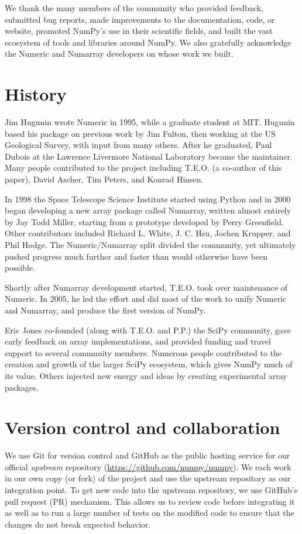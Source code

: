 We thank the many members of the community who provided
feedback, submitted bug reports, made improvements to the documentation,
code, or website, promoted NumPy's use in their scientific fields, and built
the vast ecosystem of tools and libraries around NumPy.
We also gratefully acknowledge the Numeric and Numarray developers
on whose work we built.

\section*{History}

Jim Hugunin wrote Numeric in 1995, while a graduate student at MIT.
Hugunin based his package on previous work by Jim Fulton, then working at the
US Geological Survey, with input from many others.
After he graduated, Paul Dubois at the Lawrence Livermore National Laboratory
became the maintainer.
Many people contributed to the project including T.E.O. (a co-author
of this paper), David Ascher, Tim Peters, and Konrad Hinsen.

In 1998 the Space Telescope Science Institute started using Python
and in 2000 began developing a new array package called Numarray, written
almost entirely by Jay Todd Miller, starting from a prototype developed by
Perry Greenfield.  Other contributors included Richard L. White, J. C. Hsu,
Jochen Krupper, and Phil Hodge.
The Numeric/Numarray split divided the community, yet ultimately pushed
progress much further and faster than would otherwise have been possible.

Shortly after Numarray development started, T.E.O. took over maintenance of
Numeric. In 2005, he led the effort and did most of the work to unify Numeric
and Numarray, and produce the first version of NumPy.

Eric Jones co-founded (along with T.E.O. and P.P.) the SciPy community, gave early feedback on array
implementations, and provided funding and travel support to several
community members.
Numerous people contributed to the creation and
growth of the larger SciPy ecosystem, which gives NumPy much of its
value. Others injected new energy and ideas by creating experimental
array packages.

\section*{Version control and collaboration}

We use Git for version control and GitHub as the public hosting service for our
official \emph{upstream} repository (\url{https://github.com/numpy/numpy}).
We each work in our own copy (or fork) of the project and use the
upstream repository as our integration point.
To get new code into the upstream repository, we use GitHub's
pull request (PR) mechanism.
This allows us to review code before integrating it as well as to run a
large number of tests on the modified code to ensure that the changes
do not break expected behavior.

